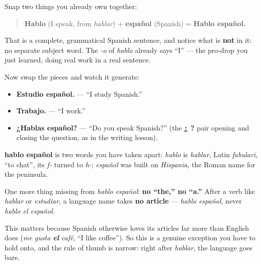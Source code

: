 \begin{grammarlens}[title={What you've built — the sentence assembled}]
Snap two things you already own together:

\begin{quote}
\textbf{Hablo} (I speak, from \emph{hablar}) + \textbf{español} (Spanish) = \textbf{Hablo español.}
\end{quote}

That is a complete, grammatical Spanish sentence, and notice what is \textbf{not} in it: no separate subject word. The \emph{-o} of \emph{hablo} already says \textquotedblleft{}I\textquotedblright{} — the pro-drop you just learned, doing real work in a real sentence.

Now swap the pieces and watch it generate:

\begin{itemize}
\raggedright
  \item \textbf{Estudio español.} — \textquotedblleft{}I study Spanish.\textquotedblright{}
  \item \textbf{Trabajo.} — \textquotedblleft{}I work.\textquotedblright{}
  \item \textbf{¿Hablas español?} — \textquotedblleft{}Do you speak Spanish?\textquotedblright{} (the \textbf{¿ ?} pair opening and closing the question, as in the writing lesson).
\end{itemize}
\end{grammarlens}

\begin{cousinweb}
\textbf{hablo español} is two words you have taken apart: \emph{hablo} is \emph{hablar}, Latin \emph{fabulari}, \textquotedblleft{}to chat\textquotedblright{}, its \emph{f-} turned to \emph{h-}; \emph{español} was built on \emph{Hispania}, the Roman name for the peninsula.
\end{cousinweb}

\begin{grammarlens}[title={Grammar Lens: languages go bare}]
One more thing missing from \emph{hablo español}: \textbf{no \textquotedblleft{}the,\textquotedblright{} no \textquotedblleft{}a.\textquotedblright{}} After a verb like \emph{hablar} or \emph{estudiar}, a language name takes \textbf{no article} — \emph{hablo español}, never \emph{hablo el español}.

This matters because Spanish otherwise loves its articles far more than English does (\emph{me gusta \textbf{el} café}, \textquotedblleft{}I like coffee\textquotedblright{}). So this is a genuine exception you have to hold onto, and the rule of thumb is narrow: right after \emph{hablar}, the language goes bare.
\end{grammarlens}

